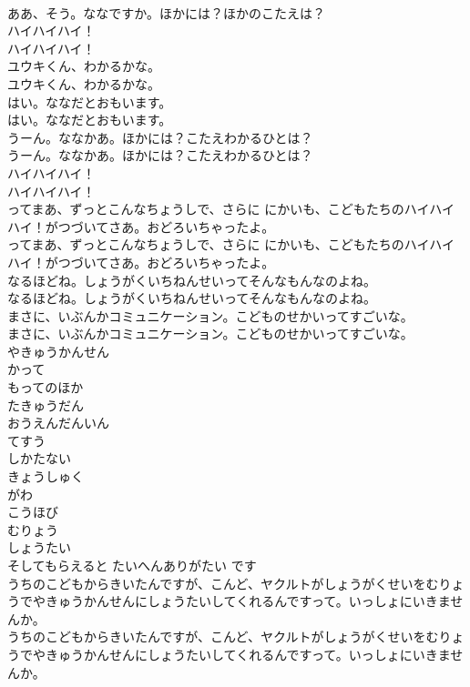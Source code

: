 \documentclass[8pt]{extreport}
\begin{document}
\begin{CJK}{UTF8}{min}
\\	ああ、そう。ななですか。ほかには？ほかのこたえは？ 
\\	ハイハイハイ！	
\\	ハイハイハイ！ 
\\	ユウキくん、わかるかな。	
\\	ユウキくん、わかるかな。 
\\	はい。ななだとおもいます。	
\\	はい。ななだとおもいます。 
\\	うーん。ななかあ。ほかには？こたえわかるひとは？	
\\	うーん。ななかあ。ほかには？こたえわかるひとは？ 
\\	ハイハイハイ！	
\\	ハイハイハイ！ 
\\	ってまあ、ずっとこんなちょうしで、さらに にかいも、こどもたちのハイハイハイ！がつづいてさあ。おどろいちゃったよ。	
\\	ってまあ、ずっとこんなちょうしで、さらに にかいも、こどもたちのハイハイハイ！がつづいてさあ。おどろいちゃったよ。 
\\	なるほどね。しょうがくいちねんせいってそんなもんなのよね。	
\\	なるほどね。しょうがくいちねんせいってそんなもんなのよね。 
\\	まさに、いぶんかコミュニケーション。こどものせかいってすごいな。	
\\	まさに、いぶんかコミュニケーション。こどものせかいってすごいな。 
\\	やきゅうかんせん
\\	かって
\\	もってのほか
\\	たきゅうだん
\\	おうえんだんいん
\\	てすう
\\	しかたない
\\	きょうしゅく
\\	がわ
\\	こうほび
\\	むりょう
\\	しょうたい
\\	そしてもらえると たいへんありがたい です
\\	うちのこどもからきいたんですが、こんど、ヤクルトがしょうがくせいをむりょうでやきゅうかんせんにしょうたいしてくれるんですって。いっしょにいきませんか。	
\\	うちのこどもからきいたんですが、こんど、ヤクルトがしょうがくせいをむりょうでやきゅうかんせんにしょうたいしてくれるんですって。いっしょにいきませんか。 

\end{CJK}
\end{document}
